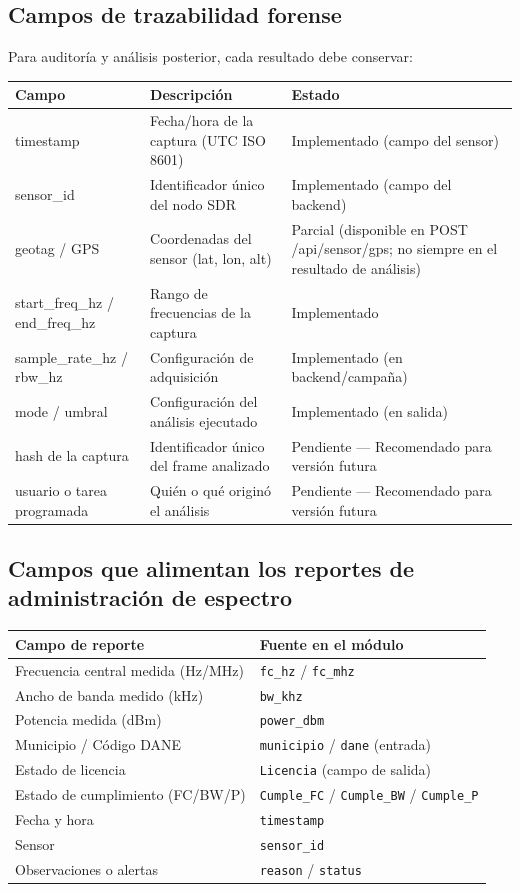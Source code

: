 \subsection{Campos de trazabilidad forense}

Para auditoría y análisis posterior, cada resultado debe conservar:

\begin{tabular}{p{4cm}p{6cm}p{3cm}}
\textbf{Campo} & \textbf{Descripción} & \textbf{Estado} \\
\hline
timestamp & Fecha/hora de la captura (UTC ISO 8601) & Implementado (campo del sensor) \\
sensor\_id & Identificador único del nodo SDR & Implementado (campo del backend) \\
geotag / GPS & Coordenadas del sensor (lat, lon, alt) & Parcial (disponible en POST /api/sensor/gps; no siempre en el resultado de análisis) \\
start\_freq\_hz / end\_freq\_hz & Rango de frecuencias de la captura & Implementado \\
sample\_rate\_hz / rbw\_hz & Configuración de adquisición & Implementado (en backend/campaña) \\
mode / umbral & Configuración del análisis ejecutado & Implementado (en salida) \\
hash de la captura & Identificador único del frame analizado & Pendiente — Recomendado para versión futura \\
usuario o tarea programada & Quién o qué originó el análisis & Pendiente — Recomendado para versión futura \\
\end{tabular}

\subsection{Campos que alimentan los reportes de administración de espectro}

\begin{tabular}{p{5cm}p{7cm}}
\textbf{Campo de reporte} & \textbf{Fuente en el módulo} \\
\hline
Frecuencia central medida (Hz/MHz) & \texttt{fc\_hz} / \texttt{fc\_mhz} \\
Ancho de banda medido (kHz) & \texttt{bw\_khz} \\
Potencia medida (dBm) & \texttt{power\_dbm} \\
Municipio / Código DANE & \texttt{municipio} / \texttt{dane} (entrada) \\
Estado de licencia & \texttt{Licencia} (campo de salida) \\
Estado de cumplimiento (FC/BW/P) & \texttt{Cumple\_FC} / \texttt{Cumple\_BW} / \texttt{Cumple\_P} \\
Fecha y hora & \texttt{timestamp} \\
Sensor & \texttt{sensor\_id} \\
Observaciones o alertas & \texttt{reason} / \texttt{status} \\
\end{tabular}

